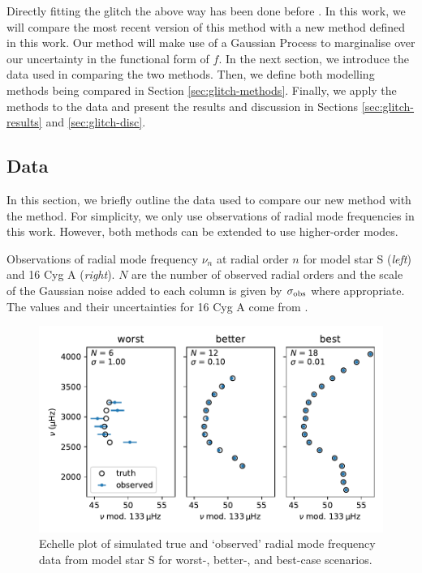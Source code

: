 
Directly fitting the glitch the above way has been done before \citep[e.g.][]{Verma.Faria.ea2014,Verma.Raodeo.ea2017,Mazumdar.Monteiro.ea2014}. In this work, we will compare the most recent version of this method \citep[][hereafter V19]{Verma.Raodeo.ea2019} with a new method defined in this work. Our method will make use of a Gaussian Process to marginalise over our uncertainty in the functional form of \(f\). In the next section, we introduce the data used in comparing the two methods. Then, we define both modelling methods being compared in Section \ref{sec:glitch-methods}. Finally, we apply the methods to the data and present the results and discussion in Sections \ref{sec:glitch-results} and \ref{sec:glitch-disc}.

\subsection{Data}\label{sec:glitch-data}

In this section, we briefly outline the data used to compare our new method with the  method. For simplicity, we only use observations of radial mode frequencies in this work. However, both methods can be extended to use higher-order modes.

\begin{table}
    \centering
    \caption{Observations of radial mode frequency \(\nu_n\) at radial order \(n\) for model star S (\emph{left}) and 16 Cyg A (\emph{right}). \(N\) are the number of observed radial orders and the scale of the Gaussian noise added to each column is given by \(\sigma_{{\mathrm{obs}}}\) where appropriate. The values and their uncertainties for 16 Cyg A come from \citet{Lund.SilvaAguirre.ea2017}.}
    \label{tab:glitch-obs}
    
\end{table}

\begin{figure}[!tb]
    \centering
    \includegraphics{figures/glitch-test-obs.pdf}
    \caption{Echelle plot of simulated true and `observed' radial mode frequency data from model star S for worst-, better-, and best-case scenarios.}
    \label{fig:glitch-test-obs}
\end{figure}

